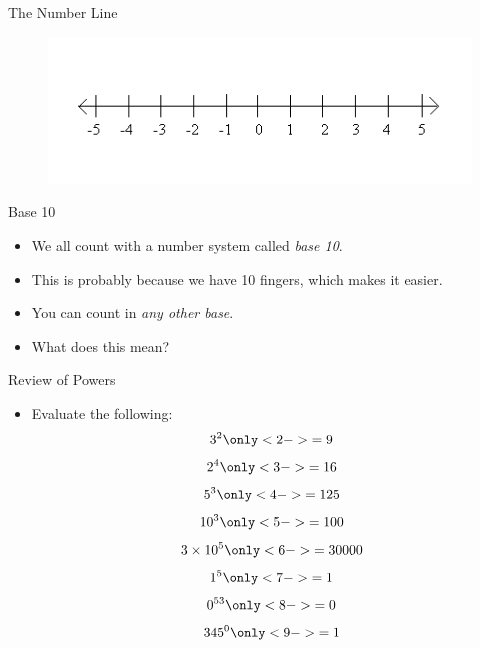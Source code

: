 \documentclass[10pt]{beamer}
\begin{document}
\begin{frame}{The Number Line}
	\begin{figure}[h]
		\centering
		\includegraphics[scale=0.7]{numberline.png}
		\caption*{}
	\end{figure}
	\vspace{-10mm}
\end{frame}

\begin{frame}{Base 10}
	\begin{itemize}[<+->]
		\item We all count with a number system called \textit{base 10}.
		\item This is probably because we have 10 fingers, which makes it easier.
		\item You can count in \textit{any other base}.
		\item What does this mean?
	\end{itemize}
\end{frame}

\begin{frame}{Review of Powers}
	\begin{itemize}[<+->]
		\item Evaluate the following:
		$$3^2 \only<2->{= 9}$$ 
		$$2^4 \only<3->{= 16}$$
		$$5^3 \only<4->{= 125}$$
		$$10^3 \only<5->{= 100}$$
		$$3\times10^5 \only<6->{= 30000}$$
		$$1^5 \only<7->{= 1}$$
		$$0^{53} \only<8->{= 0}$$
		$$345^0 \only<9->{= 1}$$
	\end{itemize}
\end{frame}
\end{document}

